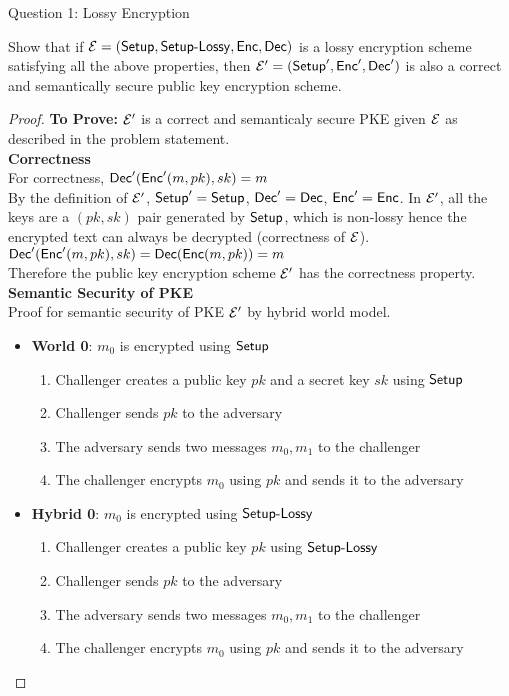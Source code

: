 \begin{solution}{Question 1: Lossy Encryption}\label{ques:1}
    \begin{question}
    Show that if $\mathcal{E} = (\mathsf{Setup}, \mathsf{Setup\text{-}Lossy}, \mathsf{Enc}, \mathsf{Dec})$ is a lossy encryption scheme
satisfying all the above properties, then $\mathcal{E}' = (\mathsf{Setup}', \mathsf{Enc}', \mathsf{Dec}')$ is also a correct
and semantically secure public key encryption scheme.
    \end{question}
    \tcblower{}
    \begin{proof}
    \textbf{To Prove:} $\mathcal{E}'$ is a correct and semanticaly secure PKE given $\mathcal{E}$ as described in the problem statement.\\
    \textbf{Correctness}\\
    For correctness, $\mathsf{Dec}'(\mathsf{Enc}'(m, pk), sk) = m$\\
    By the definition of $\mathcal{E}'$, $\mathsf{Setup}' = \mathsf{Setup}$, $\mathsf{Dec}' = \mathsf{Dec}$, $\mathsf{Enc}' = \mathsf{Enc}$. In $\mathcal{E}'$, all the keys are a $(pk,sk)$ pair generated by $\mathsf{Setup}$, which is non-lossy hence the encrypted text can always be decrypted (correctness of $\mathcal{E}$).\\
    $\mathsf{Dec}'(\mathsf{Enc}'(m, pk), sk) = \mathsf{Dec}(\mathsf{Enc}(m,pk))=m$\\
    Therefore the public key encryption scheme $\mathcal{E}'$ has the correctness property.\\
    \newline
    \textbf{Semantic Security of PKE}\\
    Proof for semantic security of PKE $\mathcal{E}'$ by hybrid world model.
    \begin{itemize}
        \item \textbf{World 0}: $m_0$ is encrypted using $\mathsf{Setup}$
        \begin{enumerate}
            \item Challenger creates a public key $pk$ and a secret key $sk$ using $\mathsf{Setup}$
            \item Challenger sends $pk$ to the adversary
            \item The adversary sends two messages $m_0, m_1$ to the challenger
            \item The challenger encrypts $m_0$ using $pk$ and sends it to the adversary
        \end{enumerate}
        
        \item \textbf{Hybrid 0}: $m_0$ is encrypted using $\mathsf{Setup\text{-}Lossy}$
        \begin{enumerate}
            \item Challenger creates a public key $pk$ using $\mathsf{Setup\text{-}Lossy}$
            \item Challenger sends $pk$ to the adversary
            \item The adversary sends two messages $m_0, m_1$ to the challenger
            \item The challenger encrypts $m_0$ using $pk$ and sends it to the adversary
        \end{enumerate}
        

\end{itemize}
\end{proof}
\end{solution}

